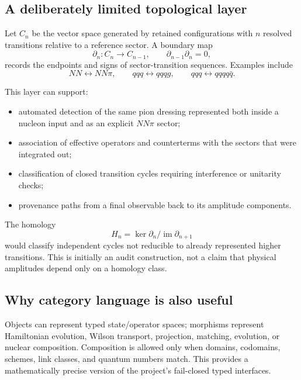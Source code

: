 \documentclass[11pt]{article}
\begin{document}
\subsection{A deliberately limited topological layer}

Let \(C_n\) be the vector space generated by retained configurations with
\(n\) resolved transitions relative to a reference sector.  A boundary map
\begin{equation}
\partial_n:C_n\longrightarrow C_{n-1},
\qquad
\partial_{n-1}\partial_n=0,
\label{eq:chain-complex}
\end{equation}
records the endpoints and signs of sector-transition sequences.  Examples
include
\[
NN\leftrightarrow NN\pi,\qquad
qqq\leftrightarrow qqqg,\qquad
qqq\leftrightarrow qqqq\bar q.
\]

This layer can support:
\begin{itemize}
\item automated detection of the same pion dressing represented both inside
a nucleon input and as an explicit \(NN\pi\) sector;
\item association of effective operators and counterterms with the sectors
that were integrated out;
\item classification of closed transition cycles requiring interference or
unitarity checks;
\item provenance paths from a final observable back to its amplitude
components.
\end{itemize}

The homology
\begin{equation}
H_n=\ker\partial_n/\operatorname{im}\partial_{n+1}
\label{eq:homology}
\end{equation}
would classify independent cycles not reducible to already represented
higher transitions.  This is initially an audit construction, not a claim
that physical amplitudes depend only on a homology class.

\subsection{Why category language is also useful}

Objects can represent typed state/operator spaces; morphisms represent
Hamiltonian evolution, Wilson transport, projection, matching, evolution,
or nuclear composition.  Composition is allowed only when domains,
codomains, schemes, link classes, and quantum numbers match.  This provides
a mathematically precise version of the project's fail-closed typed
interfaces.
\end{document}
